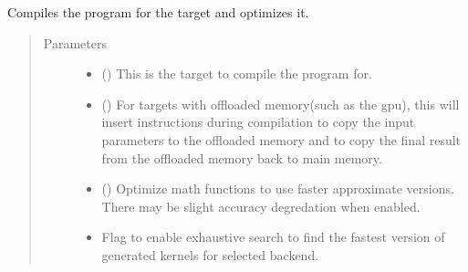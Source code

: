 \documentclass[letterpaper,10pt,english]{sphinxmanual}
\begin{document}

\begin{fulllineitems}
\label{\detokenize{reference/py:migraphx.compile}}
\sphinxAtStartPar
Compiles the program for the target and optimizes it.
\begin{quote}\begin{description}
\item[{Parameters}] \leavevmode\begin{itemize}
\item {} 
\sphinxAtStartPar
{} ({\hyperref[\detokenize{reference/py:migraphx.target}]{}}) \textendash{} This is the target to compile the program for.

\item {} 
\sphinxAtStartPar
{} () \textendash{} For targets with offloaded memory(such as the gpu), this will insert instructions during compilation to copy the input parameters to the offloaded memory and to copy the final result from the offloaded memory back to main memory.

\item {} 
\sphinxAtStartPar
{} () \textendash{} Optimize math functions to use faster approximate versions. There may be slight accuracy degredation when enabled.

\item {} 
\sphinxAtStartPar
{} \textendash{} Flag to enable exhaustive search to find the fastest version of generated kernels for selected backend.

\end{itemize}

\end{description}\end{quote}

\end{fulllineitems}
\end{document}
